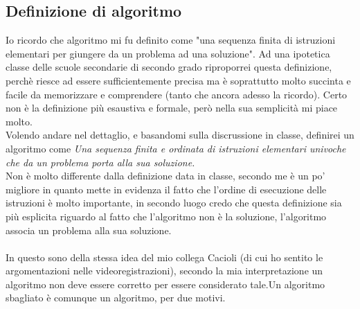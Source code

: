 \documentclass[a4paper]{article}
\begin{document}
\subsection{Definizione di algoritmo}
Io ricordo che algoritmo mi fu definito come "una sequenza finita di istruzioni elementari per giungere da un problema ad una soluzione". Ad una ipotetica classe delle scuole secondarie di secondo grado riproporrei questa definizione, perchè riesce ad essere sufficientemente precisa ma è soprattutto molto succinta e facile da memorizzare e comprendere (tanto che ancora adesso la ricordo). Certo non è la definizione più esaustiva e formale, però nella sua semplicità mi piace molto.\\
Volendo andare nel dettaglio, e basandomi sulla discrussione in classe, definirei un algoritmo come \emph{Una sequenza finita e ordinata di istruzioni elementari univoche che da un problema porta alla sua soluzione.}\\
Non è molto differente dalla definizione data in classe, secondo me è un po' migliore in quanto mette in evidenza il fatto che l'ordine di esecuzione delle istruzioni è molto importante, in secondo luogo credo che questa definizione sia più esplicita riguardo al fatto che l'algoritmo non è la soluzione, l'algoritmo associa un problema alla sua soluzione.\\\\
In questo sono della stessa idea del mio collega Cacioli (di cui ho sentito le argomentazioni nelle videoregistrazioni), secondo la mia interpretazione un algoritmo non deve essere corretto per essere considerato tale.Un algoritmo sbagliato è comunque un algoritmo, per due motivi.
\end{document}
